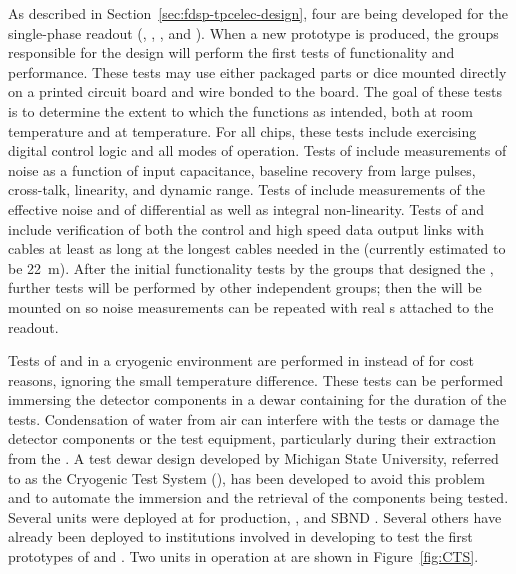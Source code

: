 As described in Section~\ref{sec:fdsp-tpcelec-design}, four  
are being developed for the   single-phase  readout 
(, , , and ). 
When a new prototype  is produced, the groups responsible for the  design will perform the first tests of 
 functionality and performance. These tests may use either 
packaged parts or dice mounted directly on a printed circuit board 
and wire bonded to the board.  The goal of these tests is to determine 
the extent to which the  functions as intended, both at room 
temperature and at \lntwo temperature.  For all chips, these tests 
include exercising digital control logic and all modes of operation. Tests 
of   include measurements of noise as a function 
of input capacitance, baseline recovery from large pulses, cross-talk, linearity, 
and dynamic range. Tests of  include measurements of the effective noise and 
of differential as well as integral non-linearity. Tests of  and  
include verification of both the control and high speed data output links with 
cables at least as long at the longest cables needed in the   
(currently estimated to be \SI{22}{m}). After the initial functionality
tests by the groups that designed the , further
tests will be performed by other independent groups; then the 
will be mounted on  so noise measurements can be repeated
with real s attached to the readout.

Tests of  and in a cryogenic environment
are performed in \lntwo instead of  for cost reasons, ignoring
the small temperature difference. These tests can be performed immersing
the detector components in a dewar containing \lntwo for the duration
of the tests. Condensation of water from air can interfere with
the tests or damage the detector components or the test equipment,
particularly during their extraction from the \lntwo. A test dewar
design developed by Michigan State University, referred to as the
Cryogenic Test System (), has been developed to avoid
this problem and to automate the immersion and the retrieval of 
the components being tested. Several  units
were deployed at  for  production,  , and SBND  .
Several others have already been deployed to institutions involved in
developing  to test the first prototypes of 
and . Two  units in operation at  are 
shown in Figure~\ref{fig:CTS}.


